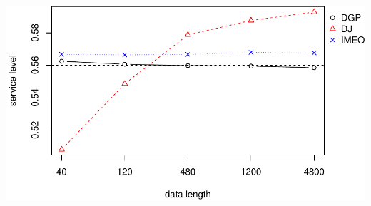\documentclass[
]{article}
\begin{document}
\includegraphics{runif_non-plot_files/figure-latex/sl-1.pdf}
\end{document}
